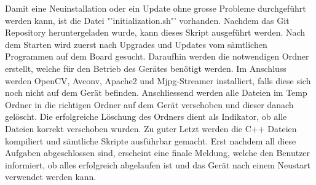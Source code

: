 Damit eine Neuinstallation oder ein Update ohne grosse Probleme durchgeführt werden kann, ist die Datei "'initialization.sh"' vorhanden. Nachdem das Git Repository heruntergeladen wurde, kann dieses Skript ausgeführt werden. Nach dem Starten wird zuerst nach Upgrades und Updates vom sämtlichen Programmen auf dem Board gesucht. Daraufhin werden die notwendigen Ordner erstellt, welche für den Betrieb des Gerätes benötigt werden. Im Anschluss werden OpenCV, Avconv, Apache2 und Mjpg-Streamer installiert, falls diese sich noch nicht auf dem Gerät befinden. Anschliessend werden alle Dateien im Temp Ordner in die richtigen Ordner auf dem Gerät verschoben und dieser danach gelöscht. Die erfolgreiche Löschung des Ordners dient als Indikator, ob alle Dateien korrekt verschoben wurden. Zu guter Letzt werden die C++ Dateien kompiliert und sämtliche Skripte ausführbar gemacht. Erst nachdem all diese Aufgaben abgeschlossen sind, erscheint eine finale Meldung, welche den Benutzer informiert, ob alles erfolgreich abgelaufen ist und das Gerät nach einem Neustart verwendet werden kann.